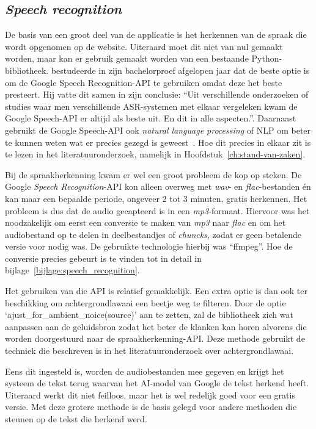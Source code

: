 \subsection{\textit{Speech recognition}}
De basis van een groot deel van de applicatie is het herkennen van de spraak die wordt opgenomen op de website. Uiteraard moet dit niet van nul gemaakt worden, maar kan er gebruik gemaakt worden van een bestaande Python-bibliotheek. \textcite{Standaert2021} bestudeerde in zijn bachelorproef afgelopen jaar dat de beste optie is om de Google Speech Recognition-API te gebruiken omdat deze het beste presteert. Hij vatte dit samen in zijn conclusie: ``Uit verschillende onderzoeken of studies waar men verschillende ASR-systemen met elkaar vergeleken kwam de Google Speech-API er altijd als beste uit. En dit in alle aspecten.''. Daarnaast gebruikt de Google Speech-API ook \textit{natural language processing} of NLP om beter te kunnen weten wat er precies gezegd is geweest~\autocite{GoogleCloud2022}. Hoe dit precies in elkaar zit is te lezen in het literatuuronderzoek, namelijk in Hoofdstuk~\ref{ch:stand-van-zaken}.

Bij de spraakherkenning kwam er wel een groot probleem de kop op steken. De Google \textit{Speech Recognition}-API kon alleen overweg met \textit{wav}- en \textit{flac}-bestanden én kan maar een bepaalde periode, ongeveer 2 tot 3 minuten, gratis herkennen. Het probleem is dus dat de audio gecapteerd is in een \textit{mp3}-formaat. Hiervoor was het noodzakelijk om eerst een conversie te maken van \textit{mp3} naar \textit{flac} en om het audiobestand op te delen in deelbestandjes of \textit{chuncks}, zodat er geen betalende versie voor nodig was. De gebruikte technologie hierbij was ``ffmpeg''. Hoe de conversie precies gebeurt is te vinden tot in detail in bijlage~\ref{bijlage:speech_recognition}.

Het gebruiken van die API is relatief gemakkelijk. Een extra optie is dan ook ter beschikking om achtergrondlawaai een beetje weg te filteren. Door de optie \newline`ajust\_for\_ambient\_noice(source)' aan te zetten, zal de bibliotheek zich wat aanpassen aan de geluidsbron zodat het beter de klanken kan horen alvorens die worden doorgestuurd naar de spraakherkenning-API. Deze methode gebruikt de techniek die beschreven is in het literatuuronderzoek over achtergrondlawaai.

Eens dit ingesteld is, worden de audiobestanden mee gegeven en krijgt het systeem de tekst terug waarvan het AI-model van Google de tekst herkend heeft. Uiteraard werkt dit niet feilloos, maar het is wel redelijk goed voor een gratis versie. Met deze grotere methode is de basis gelegd voor andere methoden die steunen op de tekst die herkend werd.

